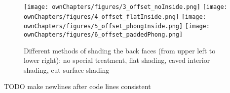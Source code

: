 \begin{figure}%
\centering
\texttt{[image: ownChapters/figures/3\_offset\_noInside.png]}%
\hspace{7.00mm}
\texttt{[image: ownChapters/figures/4\_offset\_flatInside.png]}%
\hspace{7.00mm}
\texttt{[image: ownChapters/figures/5\_offset\_phongInside.png]}%
\hspace{7.00mm}
\texttt{[image: ownChapters/figures/6\_offset\_paddedPhong.png]}%
\caption{Different methods of shading the back faces (from upper left to lower right): no special treatment, flat shading, caved interior shading, cut surface shading}%
\label{fig:shading}%
\end{figure}

TODO make newlines after code lines consistent